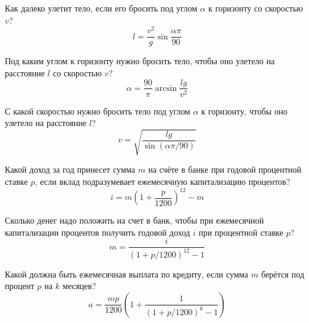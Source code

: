 
\begin{zztask}
Как далеко улетит тело, если его бросить под углом $\alpha$ к горизонту
со скоростью $v$?
%
\[
l = \frac{v^2}{g}\sin\frac{\alpha\pi}{90}
\]
\end{zztask}


\begin{zztask}
Под каким углом к горизонту нужно бросить тело, чтобы оно улетело на
расстояние $l$ со скоростью $v$?
%
\[
\alpha = \frac{90}{\pi}\arcsin\frac{lg}{v^2}
\]
\end{zztask}


\begin{zztask}
С какой скоростью нужно бросить тело под углом $\alpha$ к горизонту,
чтобы оно улетело на расстояние $l$?
%
\[
v = \sqrt{\frac{lg}{\sin(\alpha\pi/90)}}
\]
\end{zztask}


\begin{zztask}
Какой доход за год принесет сумма $m$ на счёте в банке при годовой
процентной ставке $p$, если вклад подразумевает ежемесячную
капитализацию процентов?
%
\[
i = m \left(1 + \frac{p}{1200}\right)^{12} - m
\]
\end{zztask}


\begin{zztask}
Сколько денег надо положить на счет в банк, чтобы при ежемесячной
капитализации процентов получить годовой доход $i$ при процентной
ставке $p$?
%
\[
m = \frac{i}{\left(1 + p/1200\right)^{12} - 1}
\]
\end{zztask}


\begin{zztask}
Какой должна быть ежемесячная выплата по кредиту, если сумма $m$ берётся 
под процент $p$ на $k$ месяцев?
%
\[
a = \frac{mp}{1200}\left(1 + \frac{1}{(1 + p/1200)^k - 1}\right)
\]
\end{zztask}

